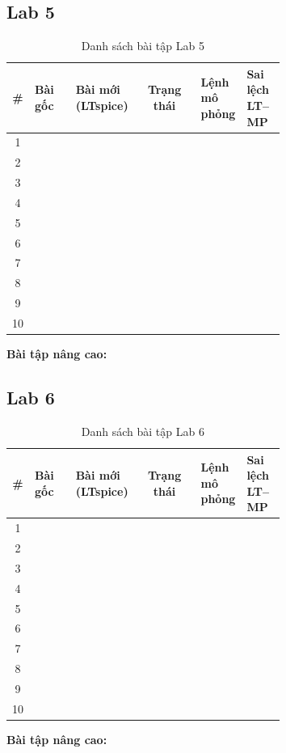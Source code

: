 \subsection{Lab 5}
\renewcommand{\arraystretch}{1.25}
\begin{longtable}{c >{\raggedright}p{0.15\linewidth} >{\raggedright}p{0.22\linewidth} c >{\raggedright}p{0.16\linewidth} p{0.14\linewidth}}
\caption{Danh sách bài tập Lab 5}\\
\toprule
\textbf{\#} & \textbf{Bài gốc} & \textbf{Bài mới (LTspice)} & \textbf{Trạng thái} & \textbf{Lệnh mô phỏng} & \textbf{Sai lệch LT--MP} \\ \midrule
1 & & & & & \\
2 & & & & & \\
3 & & & & & \\
4 & & & & & \\
5 & & & & & \\
6 & & & & & \\
7 & & & & & \\
8 & & & & & \\
9 & & & & & \\
10 & & & & & \\
\bottomrule
\end{longtable}
\noindent\textbf{Bài tập nâng cao:} 

\subsection{Lab 6}
\renewcommand{\arraystretch}{1.25}
\begin{longtable}{c >{\raggedright}p{0.15\linewidth} >{\raggedright}p{0.22\linewidth} c >{\raggedright}p{0.16\linewidth} p{0.14\linewidth}}
\caption{Danh sách bài tập Lab 6}\\
\toprule
\textbf{\#} & \textbf{Bài gốc} & \textbf{Bài mới (LTspice)} & \textbf{Trạng thái} & \textbf{Lệnh mô phỏng} & \textbf{Sai lệch LT--MP} \\ \midrule
1 & & & & & \\
2 & & & & & \\
3 & & & & & \\
4 & & & & & \\
5 & & & & & \\
6 & & & & & \\
7 & & & & & \\
8 & & & & & \\
9 & & & & & \\
10 & & & & & \\
\bottomrule
\end{longtable}
\noindent\textbf{Bài tập nâng cao:} 

